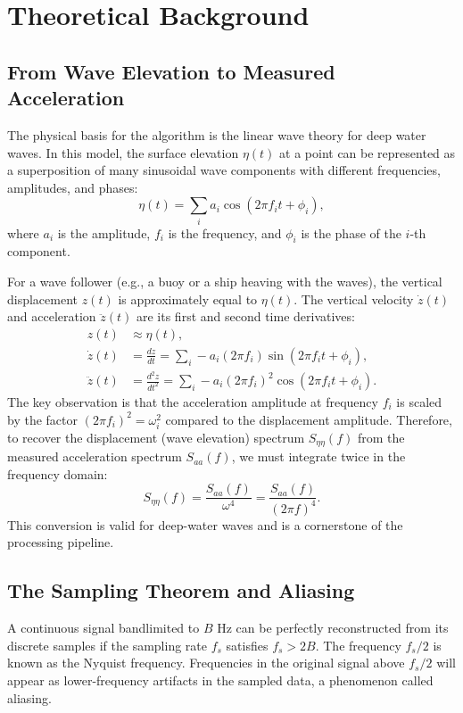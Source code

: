 \documentclass[11pt]{article}
\begin{document}
\section{Theoretical Background}
\label{sec:theory}

\subsection{From Wave Elevation to Measured Acceleration}
The physical basis for the algorithm is the linear wave theory for deep water waves. In this model, the surface elevation $\eta(t)$ at a point can be represented as a superposition of many sinusoidal wave components with different frequencies, amplitudes, and phases:
\begin{equation}
\eta(t) = \sum_{i} a_i \cos(2\pi f_i t + \phi_i),
\end{equation}
where $a_i$ is the amplitude, $f_i$ is the frequency, and $\phi_i$ is the phase of the $i$-th component.

For a wave follower (e.g., a buoy or a ship heaving with the waves), the vertical displacement $z(t)$ is approximately equal to $\eta(t)$. The vertical velocity $\dot{z}(t)$ and acceleration $\ddot{z}(t)$ are its first and second time derivatives:
\begin{align}
z(t) &\approx \eta(t), \\
\dot{z}(t) &= \frac{dz}{dt} = \sum_{i} -a_i (2\pi f_i) \sin(2\pi f_i t + \phi_i), \\
\ddot{z}(t) &= \frac{d^2z}{dt^2} = \sum_{i} -a_i (2\pi f_i)^2 \cos(2\pi f_i t + \phi_i).
\end{align}
The key observation is that the acceleration amplitude at frequency $f_i$ is scaled by the factor $(2\pi f_i)^2 = \omega_i^2$ compared to the displacement amplitude. Therefore, to recover the displacement (wave elevation) spectrum $S_{\eta\eta}(f)$ from the measured acceleration spectrum $S_{aa}(f)$, we must integrate twice in the frequency domain:
\begin{equation}
\label{eq:acc2disp}
S_{\eta\eta}(f) = \frac{S_{aa}(f)}{\omega^4} = \frac{S_{aa}(f)}{(2\pi f)^4}.
\end{equation}
This conversion is valid for deep-water waves and is a cornerstone of the processing pipeline.

\subsection{The Sampling Theorem and Aliasing}
\label{subsec:nyquist}
\begin{keyconcept}
A continuous signal bandlimited to $B$ Hz can be perfectly reconstructed from its discrete samples if the sampling rate $f_s$ satisfies $f_s > 2B$. The frequency $f_s/2$ is known as the Nyquist frequency. Frequencies in the original signal above $f_s/2$ will appear as lower-frequency artifacts in the sampled data, a phenomenon called aliasing.
\end{keyconcept}
\end{document}
